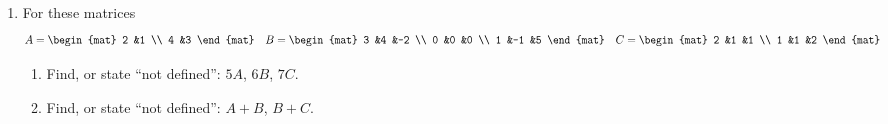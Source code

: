 \documentclass[11pt]{article}
\begin{document}
\begin{enumerate}
\item For these matrices
  \begin{equation*}
    A=
    \begin{mat}
      2  &1  \\
      4  &3
    \end{mat}
    \quad
    B=
    \begin{mat}
      3  &4  &-2 \\
      0  &0  &0  \\
      1  &-1 &5
    \end{mat}
    \quad
    C=
    \begin{mat}
      2  &1  &1 \\
      1  &1  &2
    \end{mat}
  \end{equation*}
    \begin{enumerate}
      \item Find, or state ``not defined'': $5A$, $6B$, $7C$. 
      \item Find, or state ``not defined'': $A+B$, $B+C$. 
    \end{enumerate}

\end{enumerate}
\end{document}

